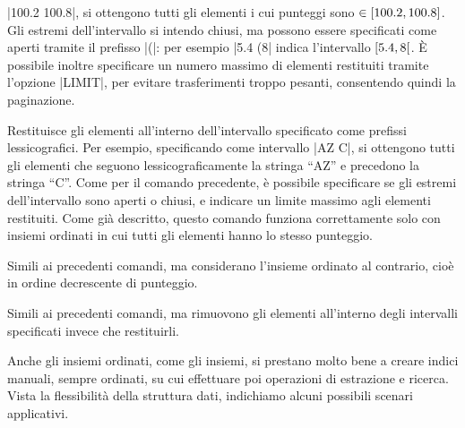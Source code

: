 \begin{description}[style=nextline,font={\bfseries\ttfamily}]
		\cverb|100.2 100.8|, si ottengono tutti gli elementi i cui punteggi sono $\in
		\interval{100.2}{100.8}$. Gli estremi dell'intervallo si intendo chiusi, ma possono essere
		specificati come aperti tramite il prefisso \cverb|(|: per esempio \cverb|5.4 (8|
		indica l'intervallo $\interval[open right]{5.4}{8}$. È possibile inoltre specificare un
		numero massimo di elementi restituiti tramite l'opzione \cverb|LIMIT|, per evitare
		trasferimenti troppo pesanti, consentendo quindi la paginazione.
	\item[{ZRANGEBYLEX key min max [LIMIT offset count]}] Restituisce gli elementi all'interno
		dell'intervallo specificato come prefissi lessicografici. Per esempio, specificando come
		intervallo \cverb|AZ C|, si ottengono tutti gli elementi che seguono lessicograficamente
		la stringa ``AZ'' e precedono la stringa ``C''. Come per il comando precedente, è possibile
		specificare se gli estremi dell'intervallo sono aperti o chiusi, e indicare un limite
		massimo agli elementi restituiti. Come già descritto, questo comando funziona correttamente
		solo con insiemi ordinati in cui tutti gli elementi hanno lo stesso punteggio.
	\item[ZREVRANGE / ZREVRANGEBYSCORE / ZREVRANGEBYLEX] Simili ai precedenti comandi, ma
		considerano l'insieme ordinato al contrario, cioè in ordine decrescente di punteggio.
	\item[ZREMRANGEBYRANK / ZREMRANGEBYSCORE / ZREMRANGEBYLEX] Simili ai precedenti comandi, ma
		rimuovono gli elementi all'interno degli intervalli specificati invece che restituirli.
\end{description}

Anche gli insiemi ordinati, come gli insiemi, si prestano molto bene a creare indici manuali,
sempre ordinati, su cui effettuare poi operazioni di estrazione e ricerca. Vista la flessibilità
della struttura dati, indichiamo alcuni possibili scenari applicativi.

